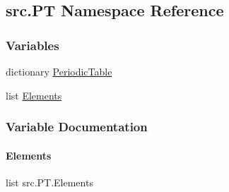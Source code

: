 \hypertarget{namespacesrc_1_1PT}{}\subsection{src.\+PT Namespace Reference}
\label{namespacesrc_1_1PT}
\subsubsection*{Variables}
\begin{DoxyCompactItemize}
\item 
dictionary \hyperlink{namespacesrc_1_1PT_acefe79d28cfa375c7875d72dba4fae6a}{Periodic\+Table}
\item 
list \hyperlink{namespacesrc_1_1PT_a1183ae2b75d1804d492f5dd708bd8569}{Elements}
\end{DoxyCompactItemize}


\subsubsection{Variable Documentation}
\mbox{\label{namespacesrc_1_1PT_a1183ae2b75d1804d492f5dd708bd8569}} 
\paragraph{\texorpdfstring{Elements}{Elements}}
{\footnotesize\ttfamily list src.\+P\+T.\+Elements}

